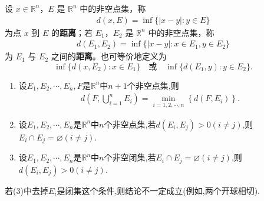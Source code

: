 \documentclass[../../main.tex]{subfiles}%
\begin{document}
\begin{definition}
设 \(x\in\mathbb{R}^n\)，\(E\) 是 \(\mathbb{R}^n\) 中的非空点集，称
\begin{align*}
d(x,E)=\inf\{|x - y|: y\in E\}
\end{align*}
为点 \(x\) 到 \(E\) 的\textbf{距离}；若 \(E_1\)，\(E_2\) 是 \(\mathbb{R}^n\) 中的非空点集，称
\begin{align*}
d(E_1,E_2)=\inf\{|x - y|: x\in E_1, y\in E_2\}
\end{align*}
为 \(E_1\) 与 \(E_2\) 之间的\textbf{距离}。也可等价地定义为
\[
\inf\{d(x,E_2): x\in E_1\} \quad \text{或} \quad \inf\{d(E_1,y): y\in E_2\}.
\] 
\end{definition}

\begin{proposition}[点集间的距离的性质]\label{proposition:点集间的距离的性质}
\begin{enumerate}[(1)]
\item 设$E_1,E_2,\cdots,E_n,F$是$\mathbb{R}^n$中$n+1$个非空点集,则
\begin{align*}
d\left( F,\bigcup_{i=1}^n{E_i} \right) =\underset{i=1,2,\cdots ,n}{\min}\left\{ d\left( F,E_i \right) \right\}.
\end{align*}

\item 设$E_1,E_2,\cdots,E_n$是$\mathbb{R}^n$中$n$个非空点集,若$d(E_i,E_j)>0(i\ne j)$,则$E_i\cap E_j=\varnothing (i\ne j)$.

\item 设$E_1,E_2,\cdots,E_n$是$\mathbb{R}^n$中$n$个非空闭集,若$E_i\cap E_j=\varnothing (i\ne j)$,则$d(E_i,E_j)>0(i\ne j)$.
\end{enumerate}
\end{proposition}
\begin{remark}
若(3)中去掉$E_i$是闭集这个条件,则结论不一定成立(例如,两个开球相切).
\end{remark}
\end{document}
